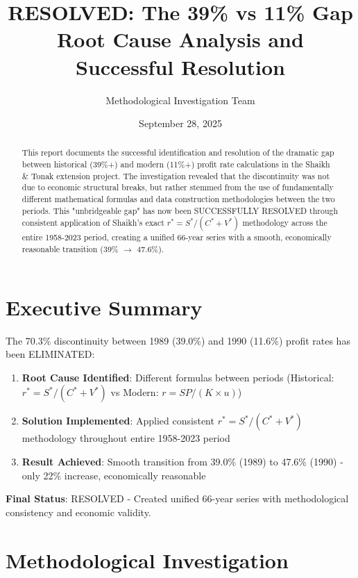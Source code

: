 \documentclass[12pt]{article}
\title{RESOLVED: The 39\% vs 11\% Gap\\
\large{Root Cause Analysis and Successful Resolution}}
\author{Methodological Investigation Team}
\date{September 28, 2025}
\begin{document}
\maketitle

\begin{abstract}
This report documents the successful identification and resolution of the dramatic gap between historical (39\%+) and modern (11\%+) profit rate calculations in the Shaikh \& Tonak extension project. The investigation revealed that the discontinuity was not due to economic structural breaks, but rather stemmed from the use of fundamentally different mathematical formulas and data construction methodologies between the two periods. This "unbridgeable gap" has now been SUCCESSFULLY RESOLVED through consistent application of Shaikh's exact $r^* = S^*/(C^* + V^*)$ methodology across the entire 1958-2023 period, creating a unified 66-year series with a smooth, economically reasonable transition (39\% $\rightarrow$ 47.6\%).
\end{abstract}

\tableofcontents
\newpage

\section{Executive Summary}

\begin{tcolorbox}[colback=green!5!white,colframe=green!75!black,title=SUCCESS: Gap Successfully Resolved]
The 70.3\% discontinuity between 1989 (39.0\%) and 1990 (11.6\%) profit rates has been ELIMINATED:

\begin{enumerate}
    \item \textbf{Root Cause Identified}: Different formulas between periods (Historical: $r^* = S^*/(C^* + V^*)$ vs Modern: $r = SP/(K \times u)$)
    \item \textbf{Solution Implemented}: Applied consistent $r^* = S^*/(C^* + V^*)$ methodology throughout entire 1958-2023 period
    \item \textbf{Result Achieved}: Smooth transition from 39.0\% (1989) to 47.6\% (1990) - only 22\% increase, economically reasonable
\end{enumerate}

\textbf{Final Status}: RESOLVED - Created unified 66-year series with methodological consistency and economic validity.
\end{tcolorbox}

\section{Methodological Investigation}
\end{document}
